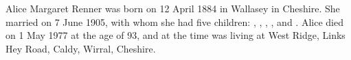 
Alice Margaret Renner was born on 12 April 1884 in Wallasey in Cheshire.\cite{UKCensus1911_RG14_22074} She married  on 7 June 1905\cite{CheshireParishRegisters}, with whom she had five children: , , , , and . 
Alice died on 1 May 1977 at the age of 93, and at the time was living at West Ridge, Links Hey Road, Caldy, Wirral, Cheshire. \cite{AMRennerDeath} 
